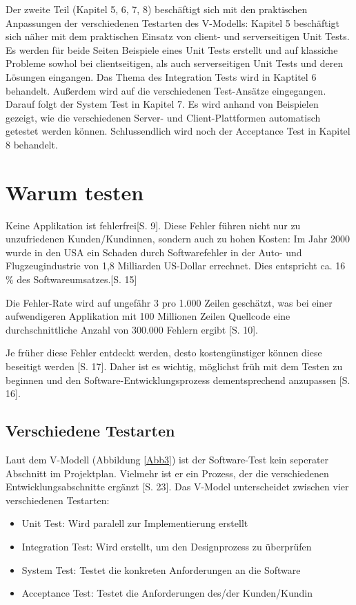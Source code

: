 \documentclass[a4paper,bibtotoc,oneside]{scrbook}
\begin{document}
Der zweite Teil (Kapitel 5, 6, 7, 8) beschäftigt sich mit den praktischen Anpassungen der verschiedenen Testarten des V-Modells: Kapitel 5 beschäftigt sich näher mit dem praktischen Einsatz von client- und serverseitigen Unit Tests. Es werden für beide Seiten Beispiele eines Unit Tests erstellt und auf klassiche Probleme sowhol bei clientseitigen, als auch serverseitigen Unit Tests und deren Lösungen eingangen. Das Thema des Integration Tests wird in Kaptitel 6 behandelt. Außerdem wird auf die verschiedenen Test-Ansätze eingegangen. Darauf folgt der System Test in Kapitel 7. Es wird anhand von Beispielen gezeigt, wie die verschiedenen Server- und Client-Plattformen automatisch getestet werden können. Schlussendlich wird noch der Acceptance Test in Kapitel 8 behandelt.

\chapter{Warum testen}
Keine Applikation ist fehlerfrei\cite{empiric_invest}[S. 9]. Diese Fehler  führen nicht nur zu unzufriedenen Kunden/Kundinnen, sondern auch zu hohen Kosten: \glqq Im Jahr 2000 wurde in den USA ein Schaden durch Softwarefehler in der Auto- und Flugzeugindustrie von 1,8 Milliarden US-Dollar errechnet. Dies entspricht ca. 16 \% des Softwareumsatzes.\grqq\cite{betrieb}[S. 15]

Die Fehler-Rate wird auf ungefähr 3 pro 1.000 Zeilen geschätzt, was bei einer aufwendigeren Applikation mit 100 Millionen Zeilen Quellcode eine durchschnittliche Anzahl von 300.000 Fehlern ergibt \cite{eval_regression}[S. 10]. 

Je früher diese Fehler entdeckt werden, desto kostengünstiger können diese beseitigt werden \cite{betrieb}[S. 17]. Daher ist es wichtig, möglichst früh mit dem Testen zu beginnen und den Software-Entwicklungsprozess dementsprechend anzupassen \cite{betrieb}[S. 16]. 

\section{Verschiedene Testarten}
Laut dem V-Modell (Abbildung \ref{Abb3}) ist der Software-Test kein seperater Abschnitt im Projektplan. Vielmehr ist er ein Prozess, der die verschiedenen Entwicklungsabschnitte ergänzt \cite{betrieb}[S. 23]. Das V-Model unterscheidet zwischen vier verschiedenen Testarten:

\begin{itemize}
	\item Unit Test: Wird paralell zur Implementierung erstellt
	\item Integration Test: Wird erstellt, um den Designprozess zu überprüfen
	\item System Test: Testet die konkreten Anforderungen an die Software
	\item Acceptance Test: Testet die Anforderungen des/der Kunden/Kundin
\end{itemize}
\end{document}
